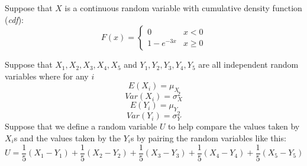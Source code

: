 \documentclass[addpoints]{examsetup}
\begin{document}




\examCoverPage

\begin{questions}
\question 

Suppose that $X$ is a continuous random variable with cumulative density function (\emph{cdf}):
$$
F(x) = 
\begin{cases}
    0 &  x < 0 \\
   1 - e^{-3x} &  x \ge 0
\end{cases}
$$

\newpage
\question
 Suppose that $X_1, X_2, X_3, X_4, X_5$ and $Y_1, Y_2, Y_3, Y_4, Y_5$ are all independent random variables where for any $i$
   $$E(X_i) = \mu_X$$
   $$Var(X_i) = \sigma_X^2$$
   $$E(Y_i) = \mu_Y$$
   $$Var(Y_i) = \sigma_Y^2$$
   Suppose that we define a random variable $U$ to help compare the values taken by $X_i$s and the values taken by the $Y_i$s by pairing the random variables like this:
   $$U = \frac{1}{5}(X_1 - Y_1) + \frac{1}{5}(X_2 - Y_2) + \frac{1}{5}(X_3 - Y_3) + \frac{1}{5}(X_4 - Y_4) + \frac{1}{5}(X_5 - Y_5) $$
       \begin{parts}

\end{parts}
\end{questions}
\end{document}
